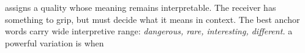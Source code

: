 assigns a quality whose meaning remains interpretable. The receiver has something to 
grip, but must decide what it means in context. The best anchor words carry wide interpretive 
range: \textit{dangerous, rare, interesting, different.} a powerful variation is when
